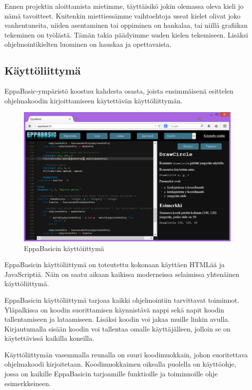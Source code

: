 Ennen projektin aloittamista mietimme,
täyttäisikö jokin olemassa oleva kieli jo nämä tavoitteet.
Kuitenkin miettiessämme vaihtoehtoja
useat kielet olivat joko vanhentuneita,
niiden asentaminen tai oppiminen on hankalaa,
tai niillä grafiikan tekeminen on työlästä.
Tämän takia päädyimme uuden kielen tekemiseen.
Lisäksi ohjelmointikielten luominen on hauskaa
ja opettavaista.

\subsection{Käyttöliittymä}
EppaBasic-ympäristö koostuu kahdesta osasta,
joista ensimmäisenä esittelen ohjelmakoodin
kirjoittamiseen käytettävän käyttöliittymän.

\begin{figure}[h]
    \centering
    \includegraphics[width=1\textwidth]{kayttoliittyma}
    \caption{EppaBasicin käyttöiittymä}
    \label{img:kayttoliittyma}
\end{figure}

EppaBasicin käyttöliittymä on toteutettu
kokonaan käyttäen HTMLää ja JavaScriptiä.
Näin on saatu aikaan kaikissa moderneissa
selaimissa yhtenäinen käyttöliittymä.

EppaBasicin käyttöliittymä tarjoaa kaikki
ohjelmointiin tarvittavat toiminnot.
Yläpalkissa on koodin suorittamisen käynnistävä
nappi sekä napit koodin tallentamiseen ja lataamiseen.
Lisäksi koodin voi jakaa muille linkin avulla.
Kirjautumalla sisään koodin voi tallentaa
omalle käyttäjälleen, jolloin se on käytettävissä
kaikilla koneilla.

Käyttöliittymän vasemmalla reunalla on
suuri koodimuokkain, johon suoritettava
ohjelmakoodi kirjoitetaan.
Koodimuokkaimen oikealla puolella on
käyttöohje, jossa on kaikille
EppaBasicin tarjoamille funktioille
ja toiminnoille ohje esimerkkeineen.

